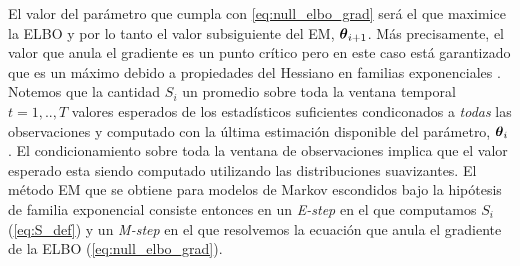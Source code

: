 El valor del parámetro que cumpla con \ref{eq:null_elbo_grad} será el que maximice la ELBO y por lo tanto el valor subsiguiente del EM, $\mbox{\boldmath$ \theta $}_{i+1}$. Más precisamente, el valor que anula el gradiente es un punto crítico pero en este caso está garantizado que es un máximo debido a propiedades del Hessiano en familias exponenciales \citep{Wainwright2008}. Notemos que la cantidad $S_i$ un promedio sobre toda la ventana temporal $t=1, .., T$ valores esperados de los estadísticos suficientes condiconados a \textit{todas} las observaciones y computado con la última estimación disponible del parámetro, $\mbox{\boldmath$ \theta $}_i$. El condicionamiento sobre toda la ventana de observaciones implica que el valor esperado esta siendo computado utilizando las distribuciones suavizantes. El método EM que se obtiene para modelos de Markov escondidos bajo la hipótesis de familia exponencial consiste entonces en un \textit{E-step} en el que computamos $S_i$ (\ref{eq:S_def}) y un \textit{M-step} en el que resolvemos la ecuación que anula el gradiente de la ELBO (\ref{eq:null_elbo_grad}).

